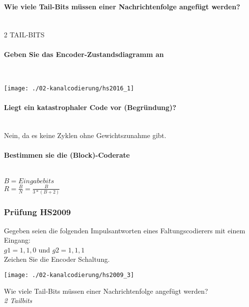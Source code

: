 \paragraph{Wie viele Tail-Bits müssen einer Nachrichtenfolge angefügt werden?}\mbox{}\\
2 TAIL-BITS

\paragraph{Geben Sie das Encoder-Zustandsdiagramm an}\mbox{}\\
\begin{center}
    \vspace{-8pt}
    \texttt{[image: ./02-kanalcodierung/hs2016\_1]}
    \vspace{-8pt}
\end{center}

\paragraph{Liegt ein katastrophaler Code vor (Begründung)?}\mbox{}\\
Nein, da es keine Zyklen ohne Gewichtszunahme gibt.

\paragraph{Bestimmen sie die (Block)-Coderate}\mbox{}\\
$B=Eingabebits$\\
$R=\frac{B}{N} = \frac{B}{3*(B+2)}$

\subsubsection{Prüfung HS2009}
Gegeben seien die folgenden Impulsantworten eines Faltungscodierers mit einem Eingang:\\
${g1}={1,1,0}$ und ${g2}={1,1,1}$\\

Zeichen Sie die Encoder Schaltung.
\begin{center}
    \vspace{-8pt}
    \texttt{[image: ./02-kanalcodierung/hs2009\_3]}
    \vspace{-8pt}
\end{center}

Wie viele Tail-Bits müssen einer Nachrichtenfolge angefügt werden?\\
\textit{2 Tailbits}\\

